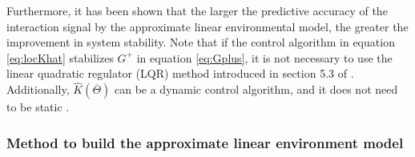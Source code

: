 \documentclass[graybox, envcountchap]{svmult}
\begin{document}
Furthermore, it has been shown that the larger the predictive accuracy of the
interaction signal by the approximate linear environmental model, the greater
the improvement in system stability. Note that if the control algorithm in
equation \ref{eq:locKhat} stabilizes $G^+$ in equation \ref{eq:Gplus}, it is not
necessary to use the linear quadratic regulator (LQR) method introduced in
section 5.3 of \cite{fairman1998linear}. Additionally,
$\hat{K}(\overline{\mathit{\Theta}})$ can be a dynamic control algorithm, and it
does not need to be static \cite{ishizaki2019retrofit}.

\smallskip
\subsubsection{Method to build the approximate linear environment model}
\end{document}
